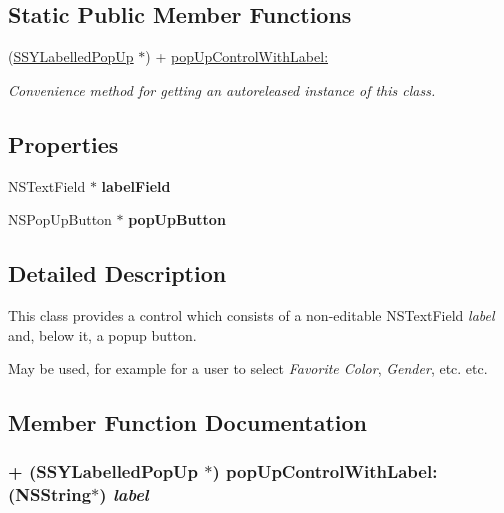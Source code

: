 \subsection*{Static Public Member Functions}
\begin{CompactItemize}
\item 
(\hyperlink{interface_s_s_y_labelled_pop_up}{SSYLabelledPopUp} $\ast$) + \hyperlink{interface_s_s_y_labelled_pop_up_f956563a30454a7e329178420edc6dc9}{popUpControlWithLabel:}
\begin{CompactList}\small\item\em Convenience method for getting an autoreleased instance of this class. \item\end{CompactList}\end{CompactItemize}
\subsection*{Properties}
\begin{CompactItemize}
\item 
\hypertarget{interface_s_s_y_labelled_pop_up_2cfc912d8500d351ff150aa03f3aab6d}{
NSTextField $\ast$ \textbf{labelField}}
\label{interface_s_s_y_labelled_pop_up_2cfc912d8500d351ff150aa03f3aab6d}

\item 
\hypertarget{interface_s_s_y_labelled_pop_up_dc265c241988efcd342ff377e1e16b18}{
NSPopUpButton $\ast$ \textbf{popUpButton}}
\label{interface_s_s_y_labelled_pop_up_dc265c241988efcd342ff377e1e16b18}

\end{CompactItemize}


\subsection{Detailed Description}
This class provides a control which consists of a non-editable NSTextField {\em label\/} and, below it, a popup button. 

May be used, for example for a user to select {\em Favorite Color\/}, {\em Gender\/}, etc. etc. 

\subsection{Member Function Documentation}
\hypertarget{interface_s_s_y_labelled_pop_up_f956563a30454a7e329178420edc6dc9}{
\subsubsection[{popUpControlWithLabel:}]{\setlength{\rightskip}{0pt plus 5cm}+ ({\bf SSYLabelledPopUp} $\ast$) popUpControlWithLabel: (NSString$\ast$) {\em label}}}
\label{interface_s_s_y_labelled_pop_up_f956563a30454a7e329178420edc6dc9}


